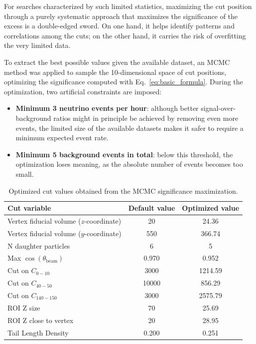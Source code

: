 For searches characterized by such limited statistics, maximizing the cut position through a purely systematic approach that maximizes the significance of the excess is a double-edged sword. On one hand, it helps identify patterns and correlations among the cuts; on the other hand, it carries the risk of overfitting the very limited data.

To extract the best possible values given the available dataset, an MCMC method was applied to sample the 10-dimensional space of cut positions, optimizing the significance computed with Eq.~\ref{eq:basic_formula}. During the optimization, two artificial constraints are imposed:
\begin{itemize}
\item \textbf{Minimum 3 neutrino events per hour}: although better signal-over-background ratios might in principle be achieved by removing even more events, the limited size of the available datasets makes it safer to require a minimum expected event rate.
\item \textbf{Minimum 5 background events in total}: below this threshold, the optimization loses meaning, as the absolute number of events becomes too small.
\end{itemize}

\begin{table}[htbp]
    \centering
    \begin{tabular}{lcc}
        \hline
        Cut variable & Default value & Optimized value \\
        \hline
        Vertex fiducial volume ($z$-coordinate)   & 20      & 24.36   \\
        Vertex fiducial volume ($y$-coordinate)   & 550     & 366.74  \\
        N daughter particles                      & 6       & 5    \\
        Max $\cos(\theta_{\mathrm{beam}})$         & 0.970   & 0.952   \\
        Cut on $C_{0-10}$                          & 3000    & 1214.59 \\
        Cut on $C_{40-50}$                          & 10000   & 856.29 \\
        Cut on $C_{140-150}$                        & 3000    & 2575.79 \\
        ROI Z size                                 & 70      & 25.69   \\
        ROI Z close to vertex                      & 20      & 28.95   \\
        Tail Length Density                        & 0.200   & 0.251   \\
        \hline
    \end{tabular}
    \caption{Optimized cut values obtained from the MCMC significance maximization.}
    \label{tab:best_parameters}
\end{table}

